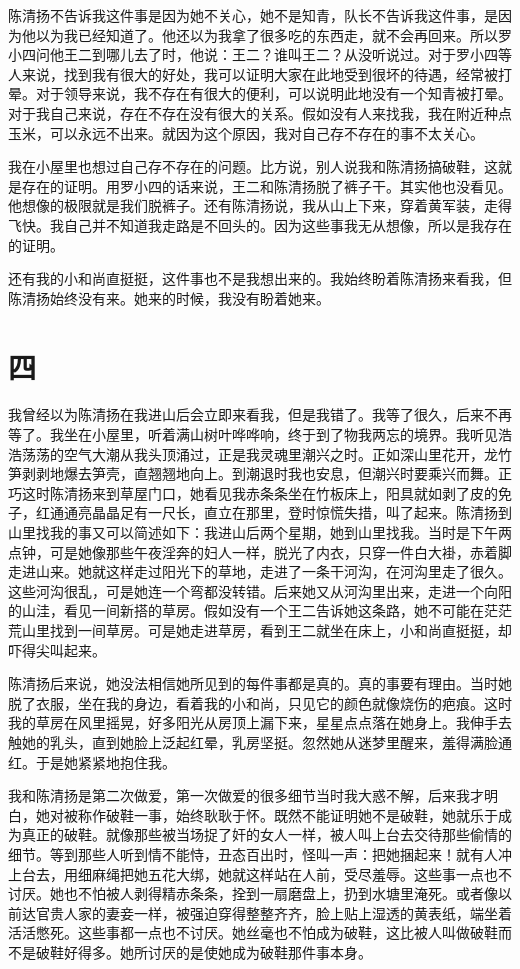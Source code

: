  陈清扬不告诉我这件事是因为她不关心，她不是知青，队长不告诉我这件事，是因为他以为我已经知道了。他还以为我拿了很多吃的东西走，就不会再回来。所以罗小四问他王二到哪儿去了时，他说：王二？谁叫王二？从没听说过。对于罗小四等人来说，找到我有很大的好处，我可以证明大家在此地受到很坏的待遇，经常被打晕。对于领导来说，我不存在有很大的便利，可以说明此地没有一个知青被打晕。对于我自己来说，存在不存在没有很大的关系。假如没有人来找我，我在附近种点玉米，可以永远不出来。就因为这个原因，我对自己存不存在的事不太关心。 
 
 我在小屋里也想过自己存不存在的问题。比方说，别人说我和陈清扬搞破鞋，这就是存在的证明。用罗小四的话来说，王二和陈清扬脱了裤子干。其实他也没看见。他想像的极限就是我们脱裤子。还有陈清扬说，我从山上下来，穿着黄军装，走得飞快。我自己并不知道我走路是不回头的。因为这些事我无从想像，所以是我存在的证明。 
 
 还有我的小和尚直挺挺，这件事也不是我想出来的。我始终盼着陈清扬来看我，但陈清扬始终没有来。她来的时候，我没有盼着她来。 
 
 

\section{四} 
 
我曾经以为陈清扬在我进山后会立即来看我，但是我错了。我等了很久，后来不再等了。我坐在小屋里，听着满山树叶哗哗响，终于到了物我两忘的境界。我听见浩浩荡荡的空气大潮从我头顶涌过，正是我灵魂里潮兴之时。正如深山里花开，龙竹笋剥剥地爆去笋壳，直翘翘地向上。到潮退时我也安息，但潮兴时要乘兴而舞。正巧这时陈清扬来到草屋门口，她看见我赤条条坐在竹板床上，阳具就如剥了皮的免子，红通通亮晶晶足有一尺长，直立在那里，登时惊慌失措，叫了起来。陈清扬到山里找我的事又可以简述如下：我进山后两个星期，她到山里找我。当时是下午两点钟，可是她像那些午夜淫奔的妇人一样，脱光了内衣，只穿一件白大褂，赤着脚走进山来。她就这样走过阳光下的草地，走进了一条干河沟，在河沟里走了很久。这些河沟很乱，可是她连一个弯都没转错。后来她又从河沟里出来，走进一个向阳的山洼，看见一间新搭的草房。假如没有一个王二告诉她这条路，她不可能在茫茫荒山里找到一间草房。可是她走进草房，看到王二就坐在床上，小和尚直挺挺，却吓得尖叫起来。 
 
陈清扬后来说，她没法相信她所见到的每件事都是真的。真的事要有理由。当时她脱了衣服，坐在我的身边，看着我的小和尚，只见它的颜色就像烧伤的疤痕。这时我的草房在风里摇晃，好多阳光从房顶上漏下来，星星点点落在她身上。我伸手去触她的乳头，直到她脸上泛起红晕，乳房坚挺。忽然她从迷梦里醒来，羞得满脸通红。于是她紧紧地抱住我。 
 
我和陈清扬是第二次做爱，第一次做爱的很多细节当时我大惑不解，后来我才明白，她对被称作破鞋一事，始终耿耿于怀。既然不能证明她不是破鞋，她就乐于成为真正的破鞋。就像那些被当场捉了奸的女人一样，被人叫上台去交待那些偷情的细节。等到那些人听到情不能恃，丑态百出时，怪叫一声：把她捆起来！就有人冲上台去，用细麻绳把她五花大绑，她就这样站在人前，受尽羞辱。这些事一点也不讨厌。她也不怕被人剥得精赤条条，拴到一扇磨盘上，扔到水塘里淹死。或者像以前达官贵人家的妻妾一样，被强迫穿得整整齐齐，脸上贴上湿透的黄表纸，端坐着活活憋死。这些事都一点也不讨厌。她丝毫也不怕成为破鞋，这比被人叫做破鞋而不是破鞋好得多。她所讨厌的是使她成为破鞋那件事本身。 
 
